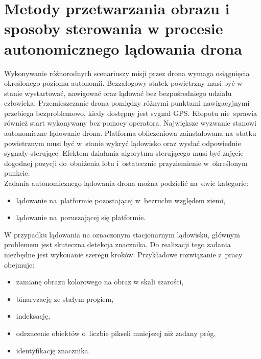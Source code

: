 \chapter{Metody przetwarzania obrazu i sposoby sterowania w procesie autonomicznego lądowania drona}
\label{cha:Metody przetwarzania obrazu i sposoby sterowania w procesie autonomicznego lądowania drona}
Wykonywanie różnorodnych scenariuszy misji przez drona wymaga osiągnięcia określonego poziomu autonomii. Bezzałogowy statek powietrzny musi być w stanie wystartować, nawigować oraz lądować bez bezpośredniego udziału człowieka. Przemieszczanie drona pomiędzy różnymi punktami nawigacyjnymi przebiega bezproblemowo, kiedy dostępny jest sygnał GPS. Kłopotu nie~sprawia również start wykonywany bez pomocy operatora. Największe wyzwanie stanowi autonomiczne lądowanie drona. Platforma obliczeniowa zainstalowana na~statku powietrznym musi być w~stanie wykryć lądowisko oraz wysłać odpowiednie sygnały sterujące. Efektem działania algorytmu sterującego musi być zajęcie dogodnej pozycji do~obniżenia lotu i~ostatecznie przyziemienie w~określonym punkcie. \\
Zadania autonomicznego lądowania drona można podzielić na~dwie kategorie:  
\begin{itemize}
	\item lądowanie na~platformie pozostającej w~bezruchu względem ziemi,
	\item lądowanie na~poruszającej się platformie.
\end{itemize}
W przypadku lądowania na oznaczonym stacjonarnym lądowisku, głównym problemem jest skuteczna detekcja znacznika. 
Do realizacji tego zadania niezbędne jest wykonanie szeregu kroków.
Przykładowe rozwiązanie z~pracy \cite{Rings} obejmuje:
\begin{itemize}
	\item zamianę obrazu kolorowego na obraz w skali szarości,
	\item binaryzację ze stałym progiem,
	\item indeksację,
	\item odrzucenie obiektów o~liczbie pikseli mniejszej niż zadany próg,
	\item identyfikację znacznika.
\end{itemize}

